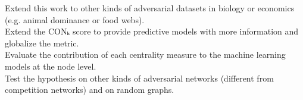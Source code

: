 \documentclass[preview]{standalone}
\begin{document}
Extend this work to other kinds of adversarial datasets in biology or economics (e.g. animal dominance or food webs).\\Extend the CONₖ score to provide predictive models with more information and globalize the metric.\\Evaluate the contribution of each centrality measure to the machine learning models at the node level.\\Test the hypothesis on other kinds of adversarial networks (different from competition networks) and on random graphs.\\
\end{document}
